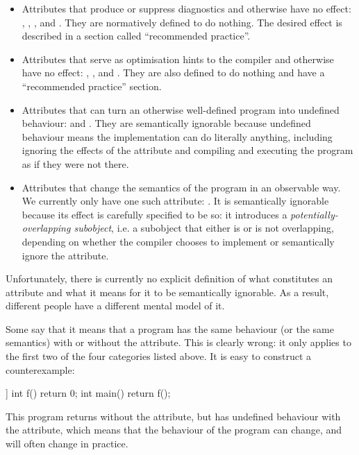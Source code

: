 \begin{itemize}
\item Attributes that produce or suppress diagnostics and otherwise have no effect: , , , and . They are normatively defined to do nothing. The desired effect is described in a section called ``recommended practice''.
\item Attributes that serve as optimisation hints to the compiler and otherwise have no effect: , , and . They are also defined to do nothing and have a ``recommended practice'' section.
\item Attributes that can turn an otherwise well-defined program into undefined behaviour:  and . They are semantically ignorable because undefined behaviour means the implementation can do literally anything, including ignoring the effects of the attribute and compiling and executing the program as if they were not there.
\item Attributes that change the semantics of the program in an observable way. We currently only have one such attribute: . It is semantically ignorable because its effect is carefully specified to be so: it introduces a \emph{potentially-overlapping subobject}, i.e. a subobject that either is or is not overlapping, depending on whether the compiler chooses to implement or semantically ignore the attribute.
\end{itemize}

Unfortunately, there is currently no explicit definition of what constitutes an attribute and what it means for it to be semantically ignorable. As a result, different people have a different mental model of it.

Some say that it means that a program has the same behaviour (or the same semantics) with or without the attribute. This is clearly wrong: it only applies to the first two of the four categories listed above. It is easy to construct a counterexample:

\begin{codeblock}
[[noreturn]] int f() { return 0; }
int main() { return f(); }
\end{codeblock}

This program returns  without the attribute, but has undefined behaviour with the attribute, which means that the behaviour of the program can change, and will often change in practice.

